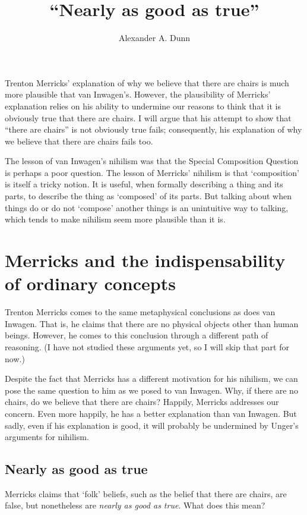 \documentclass[11pt]{article}
\title{``Nearly as good as true''}
\author{Alexander A. Dunn}
\begin{document}
\ifstandalone
\maketitle
\begin{spacing}{1.25}
\fi

\label{universe}

\noindent Trenton Merricks' explanation of why we believe that there
are chairs is much more plausible that van Inwagen's.  However, the
plausibility of Merricks' explanation relies on his ability to
undermine our reasons to think that it is obviously true that there
are chairs.  I will argue that his attempt to show that ``there are
chairs'' is not obviously true fails; consequently, his explanation of
why we believe that there are chairs fails too.  

The lesson of van Inwagen's nihilism was that the Special Composition
Question is perhaps a poor question.  The lesson of Merricks' nihilism
is that `composition' is itself a tricky notion.  It is useful, when
formally describing a thing and its parts, to describe the thing as
`composed' of its parts.  But talking about when things do or do not
`compose' another things is an unintuitive way to talking, which tends
to make nihilism seem more plausible than it is.

\section{Merricks and the indispensability of ordinary concepts}
\label{merricks}
Trenton Merricks comes to the same metaphysical conclusions as does
van Inwagen.  That is, he claims that there are no physical objects
other than human beings.  However, he comes to this conclusion through
a different path of reasoning.  (I have not studied these arguments
yet, so I will skip that part for now.)

Despite the fact that Merricks has a different motivation for his
nihilism, we can pose the same question to him as we posed to van
Inwagen.  Why, if there are no chairs, do we believe that there are
chairs?  Happily, Merricks addresses our concern.  Even more happily,
he has a better explanation than van Inwagen.  But sadly, even if his
explanation is good, it will probably be undermined by Unger's
arguments for nihilism.

\subsection{Nearly as good as true}
\label{near}
Merricks claims that `folk' beliefs, such as the belief that there are
chairs, are false, but nonetheless are {\em nearly as good as true}.
What does this mean?


\end{spacing}
\end{document}
